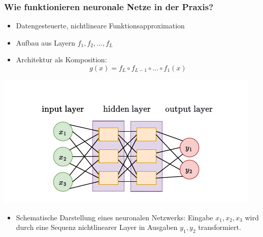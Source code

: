\begingroup
\frametitle{Wie funktionieren neuronale Netze in der Praxis?}
\begin{frame}[plain]
	\vfill
	\begin{minipage}[c]{0.53\linewidth}
		\begin{itemize}
			\item Datengesteuerte, nichtlineare Funktionsapproximation
			\item Aufbau aus Layern \( f_1, f_2, \dots, f_L \)
			\item Architektur als Komposition:
			\[
			g(x) = f_L \circ f_{L-1} \circ \dots \circ f_1(x)
			\]
		\end{itemize}
	\end{minipage}
	\hfill
	\begin{minipage}[c]{0.44\linewidth}
		\includegraphics[width=0.95\linewidth]{BilderPräsentation/NN_ausgerichtet.drawio.pdf}
		\begin{itemize}\item []	{\scriptsize Schematische Darstellung eines neuronalen Netzwerks: Eingabe \(x_1, x_2, x_3\) wird durch eine Sequenz nichtlinearer Layer in Ausgaben \(y_1, y_2\) transformiert.} \end{itemize}
		
	\end{minipage}
	\vfill
\end{frame}
\endgroup


